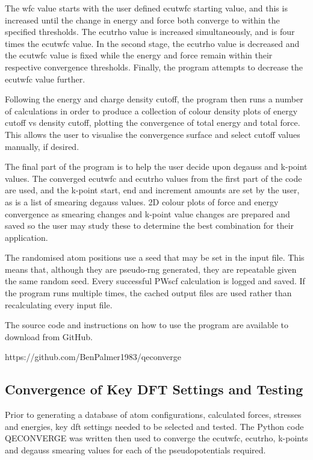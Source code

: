 The wfc value starts with the user defined ecutwfc starting value, and this is increased until the change in energy and force both converge to within the specified thresholds.  The ecutrho value is increased simultaneously, and is four times the ecutwfc value.  In the second stage, the ecutrho value is decreased and the ecutwfc value is fixed while the energy and force remain within their respective convergence thresholds.  Finally, the program attempts to decrease the ecutwfc value further.

Following the energy and charge density cutoff, the program then runs a number of calculations in order to produce a collection of colour density plots of energy cutoff vs density cutoff, plotting the convergence of total energy and total force.  This allows the user to visualise the convergence surface and select cutoff values manually, if desired.

The final part of the program is to help the user decide upon degauss and k-point values.  The converged ecutwfc and ecutrho values from the first part of the code are used, and the k-point start, end and increment amounts are set by the user, as is a list of smearing degauss values.  2D colour plots of force and energy convergence as smearing changes and k-point value changes are prepared and saved so the user may study these to determine the best combination for their application.

The randomised atom positions use a seed that may be set in the input file.  This means that, although they are pseudo-rng generated, they are repeatable given the same random seed.  Every successful PWscf calculation is logged and saved.  If the program runs multiple times, the cached output files are used rather than recalculating every input file.

The source code and instructions on how to use the program are available to download from GitHub.

https://github.com/BenPalmer1983/qeconverge





\FloatBarrier
\subsection[DFT Parameter Convergence]{Convergence of Key DFT Settings and Testing}

Prior to generating a database of atom configurations, calculated forces, stresses and energies, key \acrshort{dft} settings needed to be selected and tested.  The Python code QECONVERGE was written then used to converge the ecutwfc, ecutrho, k-points and degauss smearing values for each of the pseudopotentials required.
  
